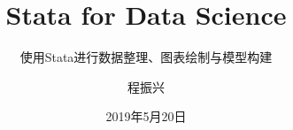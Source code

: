 \documentclass[cn,fancy,blue,11pt]{elegantbook}
\title{Stata for Data Science}
\subtitle{使用Stata进行数据整理、图表绘制与模型构建}
\author{程振兴}
\institute{https://www.czxa.top}
\date{2019年5月20日}
\begin{document}
\maketitle
\tableofcontents

\mainmatter
\hypersetup{pageanchor=true}









\nocite{ggplot2, R-base, R-bookdown, R-knitr, R-rmarkdown, xie2015, r4ds, stata, github,neat,haven,stata4ds, stcolor,cuse,finance,dict,stata2docx,stata-colorscheme,plotplain,tidy,flower}

\end{document}
